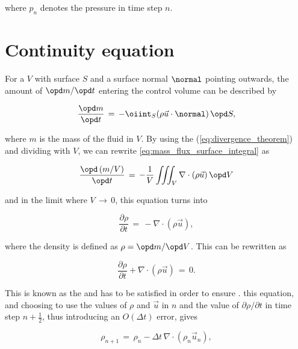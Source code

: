 where $p_n$ denotes the pressure in time step $n$.

\section{Continuity equation}

For a  $V$ with surface $S$ and a surface normal $\normal$ pointing outwards, the amount of  $\opd m/\opd t$ entering the control volume can be described by

\begin{equation} \label{eq:mass_flux_surface_integral}
\frac{\opd m}{\opd t} \,=\, -\oiint_S(\rho\vec{u}\cdot\normal)\,\opd S,
\end{equation}

where $m$ is the mass of the fluid in $V$. By using the  (\eqref{eq:divergence_theorem}) and dividing with $V$, we can rewrite \eqref{eq:mass_flux_surface_integral} as

\begin{equation} \label{eq:mass_flux_volume_integral}
\frac{\opd\,(m/V)}{\opd t} \,=\, -\frac{1}{V}\iiint_V\nabla\cdot(\rho\vec{u})\,\opd V
\end{equation}

and in the limit where $V \,\rightarrow\, 0$, this equation turns into

\begin{equation} \label{eq:density_partial_time_derivative}
\frac{\partial \rho}{\partial t} \,=\, -\nabla\cdot(\rho\vec{u}),
\end{equation}

where the density is defined as $\rho = \opd m/\opd V$. This can be rewritten as

\begin{equation} \label{eq:continuity_equation}
\frac{\partial \rho}{\partial t} + \nabla\cdot(\rho\vec{u}) \,=\, 0.
\end{equation}

This is known as the  and has to be satisfied in order to ensure .  this equation, and choosing to use the values of $\rho$ and $\vec{u}$ in \timestep $n$ and the value of $\partial \rho/\partial t$ in time step $n+\frac{1}{2}$, thus introducing an $O(\Delta t)$ error, gives

\begin{equation} \label{eq:continuity_equation_time_discretized}
\rho_{n+1} \,=\, \rho_{n} - \Delta t\,\nabla\cdot(\rho_{n}\vec{u}_{n}),
\end{equation}

